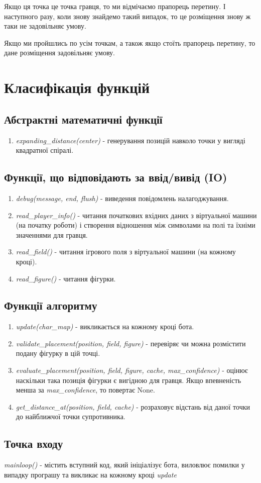 \documentclass{article}
\begin{document}
Якщо ця точка це точка гравця, то ми відмічаємо прапорець перетину. І наступного разу, коли знову знайдемо такий випадок, то це розміщення знову ж таки не задовільняє умову.

Якщо ми пройшлись по усім точкам, а також якщо стоїть прапорець перетину, то дане розміщення задовільняє умову.

\section{Класифікація функцій}

\subsection{Абстрактні математичні функції}
\begin{enumerate}
    \item \textit{expanding\_distance(center)} - генерування позицій навколо точки у вигляді квадратної спіралі.
\end{enumerate}

\subsection{Функції, що відповідають за ввід/вивід (IO)}
\begin{enumerate}
    \item \textit{debug(message, end, flush)} - виведення повідомлень налагоджування.
    \item \textit{read\_player\_info()} - читання початкових вхідних даних з віртуальної машини (на початку роботи) і створення відношення між символами на полі та їхніми значеннями для гравця.
    \item \textit{read\_field()} - читання ігрового поля з віртуальної машини (на кожному кроці).
    \item \textit{read\_figure()} - читання фігурки.
\end{enumerate}

\subsection{Функції алгоритму}
\begin{enumerate}
    \item \textit{update(char\_map)} - викликається на кожному кроці бота.
    \item \textit{validate\_placement(position, field, figure)} - перевіряє чи можна розмістити подану фігурку в цій точці.
    \item \textit{evaluate\_placement(position, field, figure, cache, max\_confidence)} - оцінює наскільки така позиція фігурки є вигідною для гравця. Якщо впевненість менша за \textit{max\_confidence}, то повертає None.
    \item \textit{get\_distance\_at(position, field, cache)} - розраховує відстань від даної точки до найближчої точки супротивника.
\end{enumerate}

\subsection{Точка входу}
\textit{mainloop()} - містить вступний код, який ініціалізує бота, виловлює помилки у випадку програшу та викликає на кожному кроці \textit{update}
\end{document}
